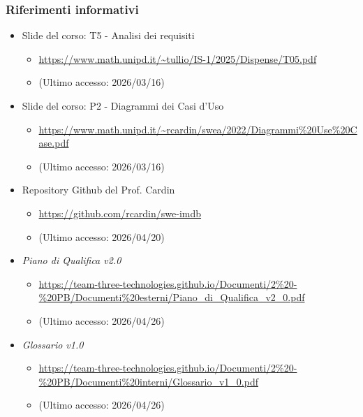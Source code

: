 \documentclass[a4paper,12pt]{article}
\begin{document}
{{            \subsubsection{Riferimenti informativi} {
                \begin{itemize}
                    \item Slide del corso: T5 - Analisi dei requisiti
                    \begin{itemize}
                        \item \url{https://www.math.unipd.it/~tullio/IS-1/2025/Dispense/T05.pdf}
                        \item[] (Ultimo accesso: 2026/03/16)
                    \end{itemize}
                    \item Slide del corso: P2 - Diagrammi dei Casi d'Uso
                    \begin{itemize}
                        \item \url{https://www.math.unipd.it/~rcardin/swea/2022/Diagrammi\%20Use\%20Case.pdf}
                        \item[] (Ultimo accesso: 2026/03/16)
                    \end{itemize}
                    \item Repository Github del Prof. Cardin
                    \begin{itemize}
                        \item \url{https://github.com/rcardin/swe-imdb}
                        \item[] (Ultimo accesso: 2026/04/20)
                    \end{itemize}
                    \item \textit{Piano di Qualifica v2.0}
                    \begin{itemize}
                        \item \url{https://team-three-technologies.github.io/Documenti/2%20-%20PB/Documenti%20esterni/Piano_di_Qualifica_v2_0.pdf}
                        \item[] (Ultimo accesso: 2026/04/26)
                    \end{itemize}
                    \item \textit{Glossario v1.0}
                    \begin{itemize}
                        \item \url{https://team-three-technologies.github.io/Documenti/2%20-%20PB/Documenti%20interni/Glossario_v1_0.pdf}
                        \item[] (Ultimo accesso: 2026/04/26)
                    \end{itemize}
                \end{itemize}
            }
        }
    }
\end{document}
